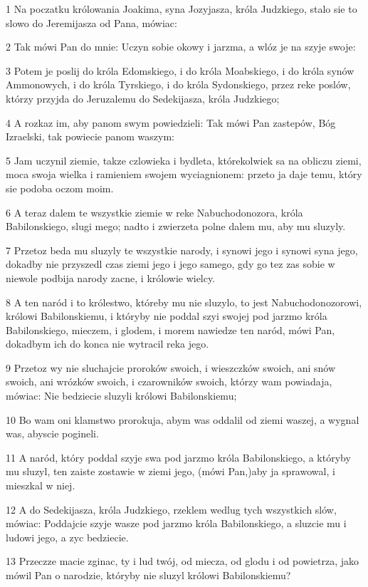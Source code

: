 \par 1 Na poczatku królowania Joakima, syna Jozyjasza, króla Judzkiego, stalo sie to slowo do Jeremijasza od Pana, mówiac:
\par 2 Tak mówi Pan do mnie: Uczyn sobie okowy i jarzma, a wlóz je na szyje swoje:
\par 3 Potem je poslij do króla Edomskiego, i do króla Moabskiego, i do króla synów Ammonowych, i do króla Tyrskiego, i do króla Sydonskiego, przez reke poslów, którzy przyjda do Jeruzalemu do Sedekijasza, króla Judzkiego;
\par 4 A rozkaz im, aby panom swym powiedzieli: Tak mówi Pan zastepów, Bóg Izraelski, tak powiecie panom waszym:
\par 5 Jam uczynil ziemie, takze czlowieka i bydleta, którekolwiek sa na obliczu ziemi, moca swoja wielka i ramieniem swojem wyciagnionem: przeto ja daje temu, który sie podoba oczom moim.
\par 6 A teraz dalem te wszystkie ziemie w reke Nabuchodonozora, króla Babilonskiego, slugi mego; nadto i zwierzeta polne dalem mu, aby mu sluzyly.
\par 7 Przetoz beda mu sluzyly te wszystkie narody, i synowi jego i synowi syna jego, dokadby nie przyszedl czas ziemi jego i jego samego, gdy go tez zas sobie w niewole podbija narody zacne, i królowie wielcy.
\par 8 A ten naród i to królestwo, któreby mu nie sluzylo, to jest Nabuchodonozorowi, królowi Babilonskiemu, i któryby nie poddal szyi swojej pod jarzmo króla Babilonskiego, mieczem, i glodem, i morem nawiedze ten naród, mówi Pan, dokadbym ich do konca nie wytracil reka jego.
\par 9 Przetoz wy nie sluchajcie proroków swoich, i wieszczków swoich, ani snów swoich, ani wrózków swoich, i czarowników swoich, którzy wam powiadaja, mówiac: Nie bedziecie sluzyli królowi Babilonskiemu;
\par 10 Bo wam oni klamstwo prorokuja, abym was oddalil od ziemi waszej, a wygnal was, abyscie pogineli.
\par 11 A naród, który poddal szyje swa pod jarzmo króla Babilonskiego, a któryby mu sluzyl, ten zaiste zostawie w ziemi jego, (mówi Pan,)aby ja sprawowal, i mieszkal w niej.
\par 12 A do Sedekijasza, króla Judzkiego, rzeklem wedlug tych wszystkich slów, mówiac: Poddajcie szyje wasze pod jarzmo króla Babilonskiego, a sluzcie mu i ludowi jego, a zyc bedziecie.
\par 13 Przeczze macie zginac, ty i lud twój, od miecza, od glodu i od powietrza, jako mówil Pan o narodzie, któryby nie sluzyl królowi Babilonskiemu?
